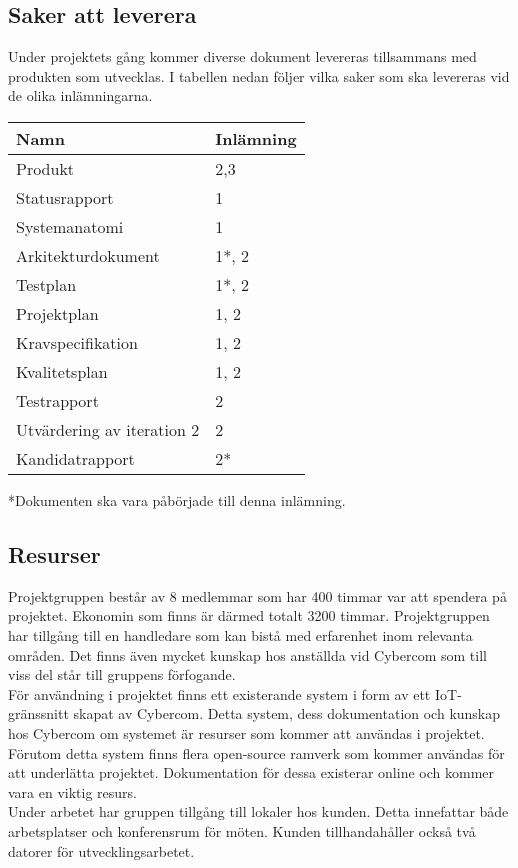 \subsection{Saker att leverera}
Under projektets gång kommer diverse dokument levereras tillsammans med produkten som utvecklas. I tabellen nedan följer vilka saker som ska levereras vid de olika inlämningarna.

\begin{center}
    \begin{tabular}{| l | l | }
        \hline
        \textbf{Namn} & \textbf{Inlämning} \\
        \hline
        \centering Produkt & 2,3\\
        \hline
        \centering Statusrapport & 1\\
        \hline
        \centering Systemanatomi & 1\\
        \hline
        \centering Arkitekturdokument & 1*, 2\\
        \hline
        \centering Testplan & 1*, 2\\
        \hline
        \centering Projektplan & 1, 2\\
        \hline
        \centering Kravspecifikation & 1, 2\\
        \hline
        \centering Kvalitetsplan & 1, 2\\
        \hline
        \centering Testrapport & 2\\
        \hline
        \centering Utvärdering av iteration 2 & 2\\
        \hline
        \centering Kandidatrapport & 2*\\
        \hline
    \end{tabular}
\end{center}

*Dokumenten ska vara påbörjade till denna inlämning.

\subsection{Resurser}
Projektgruppen består av 8 medlemmar som har 400 timmar var att spendera på projektet. Ekonomin som finns är därmed totalt 3200 timmar. Projektgruppen har tillgång till en handledare som kan bistå med erfarenhet inom relevanta områden. Det finns även mycket kunskap hos anställda vid Cybercom som till viss del står till gruppens förfogande.\\

För användning i projektet finns ett existerande system i form av ett IoT-gränssnitt skapat av Cybercom. Detta system, dess dokumentation och kunskap hos Cybercom om systemet är resurser som kommer att användas i projektet. Förutom detta system finns flera open-source ramverk som kommer användas för att underlätta projektet. Dokumentation för dessa existerar online och kommer vara en viktig resurs.\\

Under arbetet har gruppen tillgång till lokaler hos kunden. Detta innefattar både arbetsplatser och konferensrum för möten. Kunden tillhandahåller också två datorer för utvecklingsarbetet. \\
